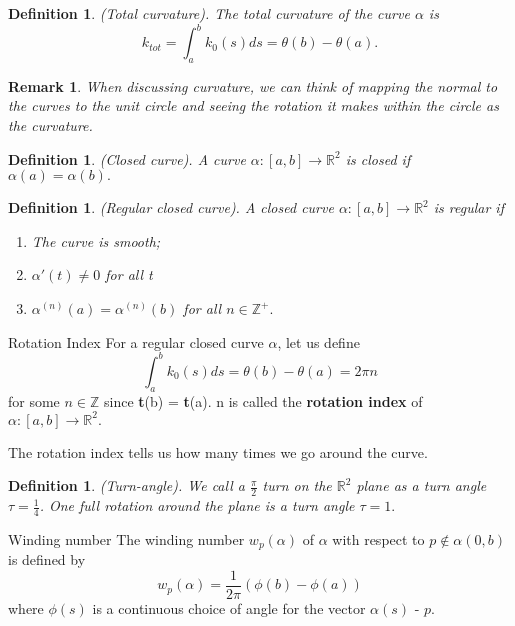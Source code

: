 \documentclass[twoside]{article}
\newtheorem{definition}[theorem]{Definition}
\newtheorem{remark}[theorem]{Remark}
\begin{document}
\begin{definition}(Total curvature). The total curvature of the curve $\alpha$ is 
$$
k_{tot} = \int_a^bk_0(s)ds = \theta(b) - \theta(a).
$$
\end{definition}

\begin{remark}When discussing curvature, we can think of mapping the normal to the curves to the unit circle and seeing the rotation it makes within the circle as the curvature.
\end{remark}

\begin{definition}(Closed curve). A curve $\alpha: [a,b] \rightarrow \mathbb{R}^2$ is closed if $\alpha(a) = \alpha(b).$
\end{definition}

\begin{definition}(Regular closed curve). A closed curve $\alpha: [a,b] \rightarrow \mathbb{R}^2$ is regular if 
\begin{enumerate}
    \item The curve is smooth;
    \item $\alpha'(t) \neq 0$ for all t
    \item $\alpha^{(n)}(a) = \alpha^{(n)}(b)$ for all $n \in \mathbb{Z}^+.$
\end{enumerate}
\end{definition}

\begin{definition_exam}{Rotation Index}{} For a regular closed curve $\alpha$, let us define 
$$
\int_a^bk_0(s)ds = \theta(b) - \theta(a) = 2\pi n
$$
for some $n \in \mathbb{Z}$ since \textbf{t}(b) = \textbf{t}(a). n is called the \textbf{rotation index} of $\alpha: [a,b] \rightarrow \mathbb{R}^2.$
\end{definition_exam}

The rotation index tells us how many times we go around the curve.

\begin{definition}(Turn-angle). We call a $\frac{\pi}{2}$ turn on the $\mathbb{R}^2$ plane as a turn angle $\tau = \frac{1}{4}$. One full rotation around the plane is a turn angle $\tau = 1.$
\end{definition}


\begin{definition_exam}{Winding number}{} The winding number $w_p(\alpha)$ of $\alpha$ with respect to $p \not \in \alpha(0,b)$ is defined by 
$$
w_p(\alpha) = \frac{1}{2\pi}(\phi(b) - \phi(a))
$$
where $\phi(s)$ is a continuous choice of angle for the vector $\alpha(s)$ - $p$.
\end{definition_exam}
\end{document}
